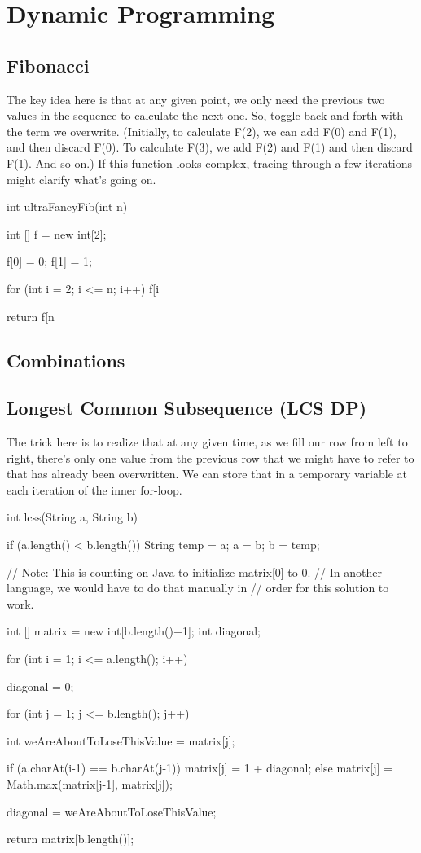 \section{Dynamic Programming}
\subsection*{Fibonacci}
The key idea here is that at any given point, we only need the previous two values in the sequence to calculate the next one. So, toggle back and forth with the term we overwrite. (Initially, to calculate F(2), we can add F(0) and F(1), and then discard F(0). To calculate F(3), we add F(2) and F(1) and then discard F(1). And so on.) If this function looks complex, tracing through a few iterations might clarify what's going on.

int ultraFancyFib(int n)
{
   int [] f = new int[2];

   f[0] = 0;
   f[1] = 1;

   for (int i = 2; i <= n; i++)
      f[i%

   return f[n%
}

\subsection*{Combinations}
\lipsum[1][1-2]
\subsection*{Longest Common Subsequence (LCS DP)}
The trick here is to realize that at any given time, as we fill our row from left to right, there's only one value from the previous row that we might have to refer to that has already been overwritten. We can store that in a temporary variable at each iteration of the inner for-loop.

int lcss(String a, String b)
{
   if (a.length() < b.length())
   {
      String temp = a; a = b; b = temp;
   }

   // Note: This is counting on Java to initialize matrix[0] to 0.
   // In another language, we would have to do that manually in
   // order for this solution to work.

   int [] matrix = new int[b.length()+1];
   int diagonal;

   for (int i = 1; i <= a.length(); i++)
   {
      diagonal = 0;

      for (int j = 1; j <= b.length(); j++)
      {
         int weAreAboutToLoseThisValue = matrix[j];

         if (a.charAt(i-1) == b.charAt(j-1))
            matrix[j] = 1 + diagonal;
         else
            matrix[j] = Math.max(matrix[j-1], matrix[j]);

         diagonal = weAreAboutToLoseThisValue;
      }
   }

   return matrix[b.length()];
}

